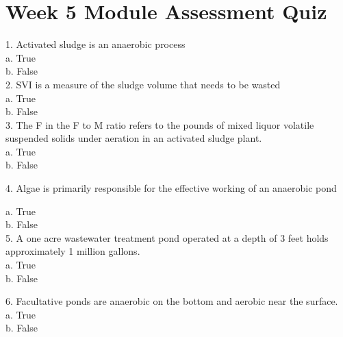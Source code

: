 \chapter{Week 5 Module Assessment Quiz}



1. Activated sludge is an anaerobic process\\

a. True \\
b. False \\


\vspace{0.3cm}
2. SVI is a measure of the sludge volume that needs to be wasted\\

a. True \\
b. False \\


\vspace{0.3cm}
3. The F in the F to M ratio refers to the pounds of mixed liquor volatile suspended solids under aeration in an activated sludge plant.\\

a. True \\
b. False \\

\vspace{0.3cm}

4. Algae is primarily responsible for the effective working of an anaerobic pond

\vspace{0.3cm}
a. True \\
b. False \\


\vspace{0.3cm}
5. A one acre wastewater treatment pond operated at a depth of 3 feet holds approximately 1 million gallons.\\

a. True \\
b. False \\

\vspace{0.3cm}

6. Facultative ponds are anaerobic on the bottom and aerobic near the surface. \\

a. True \\
b. False \\

\vspace{0.3cm}

